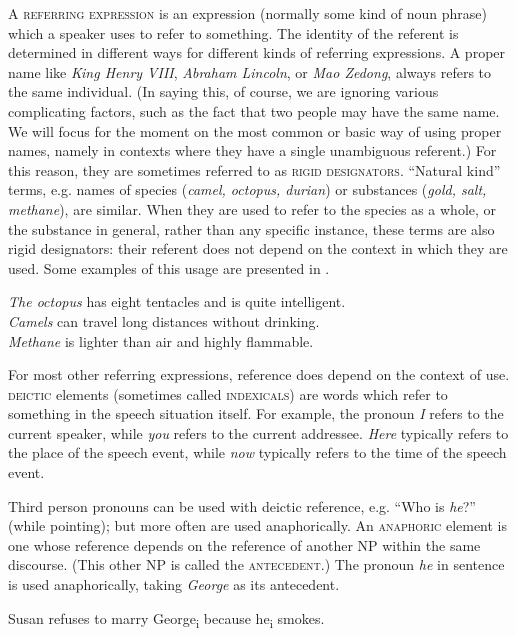 A \textsc{referring expression} is an expression (normally some kind of noun phrase) which a speaker uses to refer to something. The identity of the referent is determined in different ways for different kinds of referring expressions. A proper name like \textit{King Henry VIII}, \textit{Abraham Lincoln}, or \textit{Mao Zedong}, always refers to the same individual. (In saying this, of course, we are ignoring various complicating factors, such as the fact that two people may have the same name. We will focus for the moment on the most common or basic way of using proper names, namely in contexts where they have a single unambiguous referent.) For this reason, they are sometimes referred to as \textsc{rigid designators}. “Natural kind” terms, e.g. names of species (\textit{camel, octopus, durian}) or substances (\textit{gold, salt, methane}), are similar. When they are used to refer to the species as a whole, or the substance in general, rather than any specific instance, these terms are also rigid designators: their referent does not depend on the context in which they are used. Some examples of this usage are presented in .


\ea \label{ex:2.3}
\ea \textit{The octopus} has eight tentacles and is quite intelligent.\\
\ex \textit{Camels} can travel long distances without drinking.\\
\ex \textit{Methane} is lighter than air and highly flammable.
\z
\z


For most other referring expressions, reference does depend on the context of use. \textsc{deictic} elements (sometimes called \textsc{indexicals}) are words which refer to something in the speech situation itself. For example, the pronoun \textit{I} refers to the current speaker, while \textit{you} refers to the current addressee. \textit{Here} typically refers to the place of the speech event, while \textit{now} typically refers to the time of the speech event.



Third person pronouns can be used with deictic reference, e.g. “Who is \textit{he}?” (while pointing); but more often are used anaphorically. An \textsc{anaphoric} element is one whose reference depends on the reference of another NP within the same discourse. (This other NP is called the \textsc{antecedent}.) The pronoun \textit{he} in sentence  is used anaphorically, taking \textit{George} as its antecedent.


\ea \label{ex:2.4}
Susan refuses to marry George\textsubscript{i} because he\textsubscript{i} smokes.
\z


